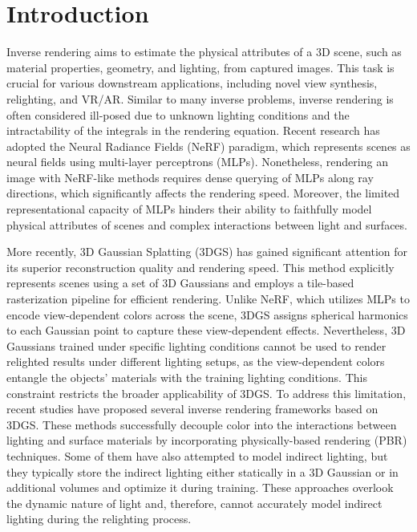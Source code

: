 \documentclass{article} %
\begin{document}
\section{Introduction}
Inverse rendering \citep{barrow1978recovering} aims to estimate the physical attributes of a 3D scene, such as material properties, geometry, and lighting, from captured images. This task is crucial for various downstream applications, including novel view synthesis, relighting, and VR/AR. Similar to many inverse problems, inverse rendering is often considered ill-posed due to unknown lighting conditions and the intractability of the integrals in the rendering equation. Recent research has adopted the Neural Radiance Fields (NeRF) \citep{mildenhall2021nerf} paradigm, which represents scenes as neural fields using multi-layer perceptrons (MLPs). Nonetheless, rendering an image with NeRF-like methods requires dense querying of MLPs along ray directions, which significantly affects the rendering speed. Moreover, the limited representational capacity of MLPs hinders their ability to faithfully model physical attributes of scenes and complex interactions between light and surfaces.

More recently, 3D Gaussian Splatting (3DGS) \citep{3dgs} has gained significant attention for its superior reconstruction quality and rendering speed. This method explicitly represents scenes using a set of 3D Gaussians and employs a tile-based rasterization pipeline for efficient rendering. Unlike NeRF, which utilizes MLPs to encode view-dependent colors across the scene, 3DGS assigns spherical harmonics to each Gaussian point to capture these view-dependent effects. Nevertheless, 3D Gaussians trained under specific lighting conditions cannot be used to render relighted results under different lighting setups, as the view-dependent colors entangle the objects' materials with the training lighting conditions. This constraint restricts the broader applicability of 3DGS. To address this limitation, recent studies \citep{jiang2024gaussianshader, gir, gsir, relightable, wu2024deferredgs} have proposed several inverse rendering frameworks based on 3DGS. These methods successfully decouple color into the interactions between lighting and surface materials by incorporating physically-based rendering (PBR) techniques. Some of them have also attempted to model indirect lighting, but they typically store the indirect lighting either statically in a 3D Gaussian or in additional volumes and optimize it during training. These approaches overlook the dynamic nature of light and, therefore, cannot accurately model indirect lighting during the relighting process.
\end{document}
